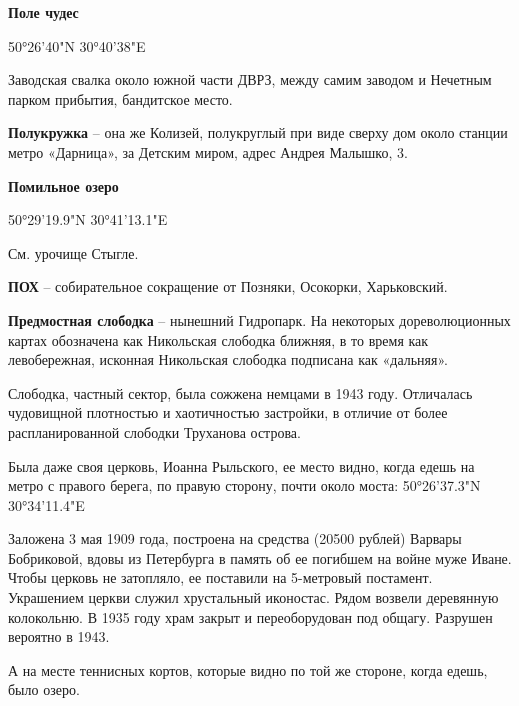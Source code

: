 \medskip

\textbf{Поле чудес}

50°26'40"N 30°40'38"E

Заводская свалка около южной части ДВРЗ, между самим заводом и Нечетным парком прибытия, бандитское место.\\

\medskip

\textbf{Полукружка} – она же Колизей, полукруглый при виде сверху дом около станции метро «Дарница», за Детским миром, адрес Андрея Малышко, 3.\\

\medskip

\textbf{Помильное озеро}

50°29'19.9"N 30°41'13.1"E

См. урочище Стыгле.\\

\medskip

\textbf{ПОХ} – собирательное сокращение от Позняки, Осокорки, Харьковский.\\

\medskip

\textbf{Предмостная слободка} – нынешний Гидропарк. На некоторых дореволюционных картах обозначена как Никольская слободка ближняя, в то время как левобережная, исконная Никольская слободка подписана как «дальняя».

Слободка, частный сектор, была сожжена немцами в 1943 году. Отличалась чудовищной плотностью и хаотичностью застройки, в отличие от более распланированной слободки Труханова острова. 

Была даже своя церковь, Иоанна Рыльского, ее место видно, когда едешь на метро с правого берега, по правую сторону, почти около моста: 50°26'37.3"N 30°34'11.4"E

Заложена 3 мая 1909 года, построена на средства  (20500 рублей) Варвары Бобриковой, вдовы из Петербурга в память об ее погибшем на войне муже Иване. Чтобы церковь не затопляло, ее поставили на 5-метровый постамент. Украшением церкви служил хрустальный иконостас. Рядом возвели деревянную колокольню. В 1935 году храм закрыт и переоборудован под общагу. Разрушен вероятно в 1943.

А на месте теннисных кортов, которые видно по той же стороне, когда едешь, было озеро.\\

\medskip


